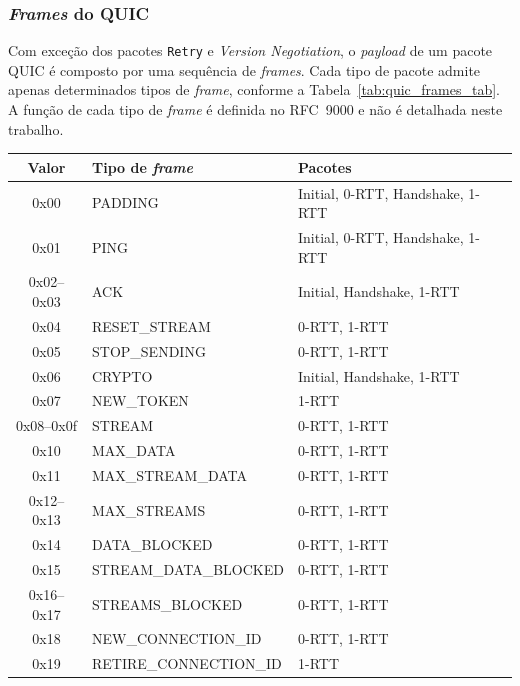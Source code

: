\subsubsection{\textit{Frames} do QUIC}

Com exceção dos pacotes \texttt{Retry} e \textit{Version Negotiation}, o \textit{payload} de um pacote QUIC é composto por uma sequência de \textit{frames}. Cada tipo de pacote admite apenas determinados tipos de \textit{frame}, conforme a Tabela~\ref{tab:quic_frames_tab}. A função de cada tipo de \textit{frame} é definida no RFC~9000 \citep{rfc9000} e não é detalhada neste trabalho.


\begin{table}[!ht]
\centering
\begin{tabular}{|c|l|l|}
\hline
\textbf{Valor} & \textbf{Tipo de \textit{frame}} & \textbf{Pacotes} \\ \hline
0x00       & PADDING                 & Initial, 0-RTT, Handshake, 1-RTT \\ \hline
0x01       & PING                    & Initial, 0-RTT, Handshake, 1-RTT \\ \hline
0x02--0x03 & ACK                     & Initial, Handshake, 1-RTT \\ \hline
0x04       & RESET\_STREAM            & 0-RTT, 1-RTT \\ \hline
0x05       & STOP\_SENDING            & 0-RTT, 1-RTT \\ \hline
0x06       & CRYPTO                  & Initial, Handshake, 1-RTT \\ \hline
0x07       & NEW\_TOKEN               & 1-RTT \\ \hline
0x08--0x0f & STREAM                  & 0-RTT, 1-RTT \\ \hline
0x10       & MAX\_DATA                & 0-RTT, 1-RTT \\ \hline
0x11       & MAX\_STREAM\_DATA        & 0-RTT, 1-RTT \\ \hline
0x12--0x13 & MAX\_STREAMS             & 0-RTT, 1-RTT \\ \hline
0x14       & DATA\_BLOCKED            & 0-RTT, 1-RTT \\ \hline
0x15       & STREAM\_DATA\_BLOCKED    & 0-RTT, 1-RTT \\ \hline
0x16--0x17 & STREAMS\_BLOCKED         & 0-RTT, 1-RTT \\ \hline
0x18       & NEW\_CONNECTION\_ID      & 0-RTT, 1-RTT \\ \hline
0x19       & RETIRE\_CONNECTION\_ID   & 1-RTT \\ \hline

\end{tabular}
\end{table}
